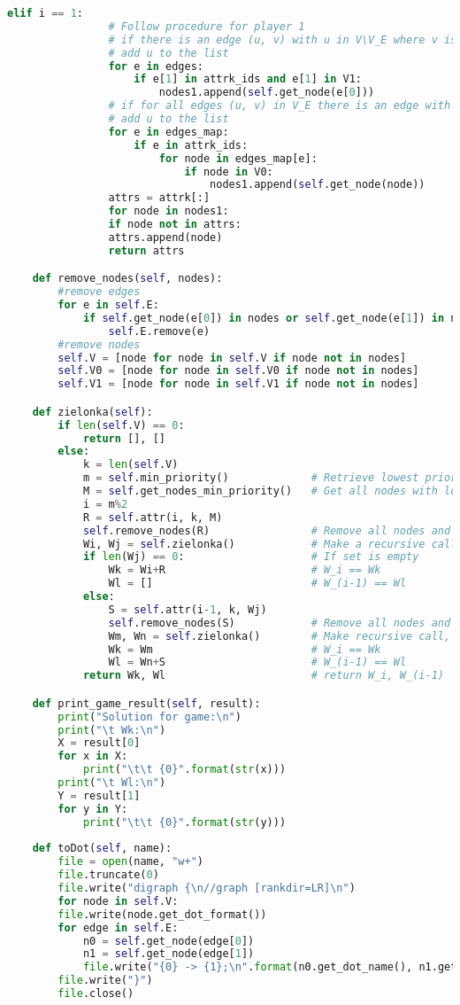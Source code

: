\documentclass[12pt]{article}
\begin{document}
\begin{lstlisting}[language=python]
			elif i == 1:
				# Follow procedure for player 1
				# if there is an edge (u, v) with u in V\V_E where v is in attrk, 
				# add u to the list
				for e in edges:
					if e[1] in attrk_ids and e[1] in V1:
						nodes1.append(self.get_node(e[0]))
				# if for all edges (u, v) in V_E there is an edge with v in attrk, 
				# add u to the list
				for e in edges_map:
					if e in attrk_ids:
						for node in edges_map[e]:
							if node in V0:
								nodes1.append(self.get_node(node))
				attrs = attrk[:]
				for node in nodes1:
				if node not in attrs:
				attrs.append(node)
				return attrs

	def remove_nodes(self, nodes):
		#remove edges
		for e in self.E:
			if self.get_node(e[0]) in nodes or self.get_node(e[1]) in nodes:
				self.E.remove(e)
		#remove nodes
		self.V = [node for node in self.V if node not in nodes]
		self.V0 = [node for node in self.V0 if node not in nodes]
		self.V1 = [node for node in self.V1 if node not in nodes]

	def zielonka(self):
		if len(self.V) == 0:
			return [], []
		else:
			k = len(self.V)
			m = self.min_priority()             # Retrieve lowest priority
			M = self.get_nodes_min_priority()   # Get all nodes with lowest priority
			i = m%2
			R = self.attr(i, k, M)
			self.remove_nodes(R)                # Remove all nodes and related edges from the game
			Wi, Wj = self.zielonka()            # Make a recursive call, W_i' == Wi, W_(i-1)' == Wj
			if len(Wj) == 0:                    # If set is empty
				Wk = Wi+R                       # W_i == Wk
				Wl = []                         # W_(i-1) == Wl
			else:
				S = self.attr(i-1, k, Wj)
				self.remove_nodes(S)            # Remove all nodes and related edges from the game
				Wm, Wn = self.zielonka()        # Make recursive call, W_i" == Wm, W_(i-1)" == Wn
				Wk = Wm                         # W_i == Wk
				Wl = Wn+S                       # W_(i-1) == Wl
			return Wk, Wl                       # return W_i, W_(i-1)

	def print_game_result(self, result):
		print("Solution for game:\n")
		print("\t Wk:\n")
		X = result[0]
		for x in X:
			print("\t\t {0}".format(str(x)))
		print("\t Wl:\n")
		Y = result[1]
		for y in Y:
			print("\t\t {0}".format(str(y)))
	
	def toDot(self, name):
		file = open(name, "w+")
		file.truncate(0)
		file.write("digraph {\n//graph [rankdir=LR]\n")
		for node in self.V:
		file.write(node.get_dot_format())
		for edge in self.E:
			n0 = self.get_node(edge[0])
			n1 = self.get_node(edge[1])
			file.write("{0} -> {1};\n".format(n0.get_dot_name(), n1.get_dot_name()))
		file.write("}")
		file.close()



\end{lstlisting}
\end{document}
